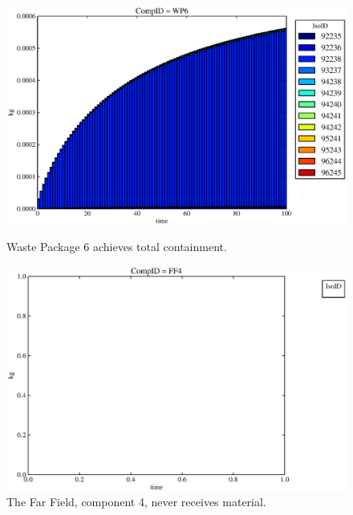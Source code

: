 \begin{figure}[ht]
\begin{minipage}[b]{0.45\linewidth}
\end{minipage}
\hspace{0.05\linewidth}
\begin{minipage}[b]{0.45\linewidth}
  \includegraphics[width=\textwidth]{./chapters/demonstration/base/lpDMII2.eps}
  \caption[Case LPDMII Waste Package Contaminants.]{ 
    Waste Package 6 achieves total containment. 
    }
  \label{fig:lpDMIIwp6}

  \includegraphics[width=\textwidth]{./chapters/demonstration/base/lpDMII0.eps}
  \caption[Case LPDMII Far Field Contaminants.]{ 
    The Far Field, component 4, never receives material.
    }
  \label{fig:lpDMIIff0}


  \end{minipage}
\end{figure}

\FloatBarrier
